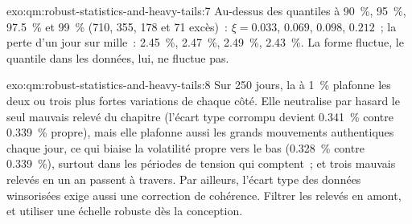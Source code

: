 \begin{solution}{exo:qm:robust-statistics-and-heavy-tails:7}
Au-dessus des quantiles à 90~\%, 95~\%, 97.5~\% et 99~\% (710, 355, 178 et 71 excès)~: $\xi = 0.033$, $0.069$, $0.098$, $0.212$~; la perte
d'un jour sur mille~: 2.45~\%, 2.47~\%, 2.49~\%, 2.43~\%. La forme fluctue, le quantile dans les données, lui, ne fluctue pas.
\end{solution}

\begin{solution}{exo:qm:robust-statistics-and-heavy-tails:8}
Sur 250 jours, la  à 1~\% plafonne les deux ou trois plus fortes variations de chaque côté. Elle neutralise par hasard le seul mauvais relevé du chapitre
(l'écart type corrompu devient 0.341~\% contre 0.339~\% propre), mais elle plafonne aussi les grands mouvements authentiques chaque jour, ce qui biaise la
volatilité propre vers le bas (0.328~\% contre 0.339~\%), surtout dans les périodes de tension qui comptent~; et trois mauvais relevés en un an passent à travers. Par ailleurs,
l'écart type des données winsorisées exige aussi une correction de cohérence. Filtrer les relevés en amont, et utiliser une échelle robuste dès la conception.
\end{solution}

